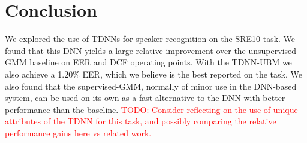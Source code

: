 \documentclass{article}
\newcommand\davidnote[1]{\textcolor{red}{#1}}
\begin{document}
\section{Conclusion}

We explored the use of TDNNs for speaker recognition on the SRE10 task.
We found that this DNN yields a large relative improvement over the
unsupervised GMM baseline on EER and DCF operating points. With the
TDNN-UBM we also achieve a 1.20\% EER, which we believe is the best
reported on the task. We also found that the supervised-GMM, normally
of minor use in the DNN-based system, can be 
used on its own as a fast alternative to the DNN with better performance
than the baseline. 
\davidnote{TODO: Consider reflecting on the use of unique attributes
of the TDNN for this task, and possibly comparing the relative 
performance gains here vs related work.}




\end{document}
